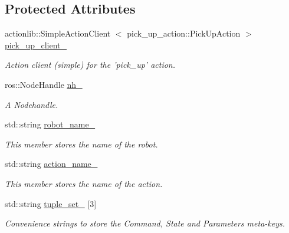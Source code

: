 \subsection*{\-Protected \-Attributes}
\begin{DoxyCompactItemize}
\item 
actionlib\-::\-Simple\-Action\-Client\*
$<$ pick\-\_\-up\-\_\-action\-::\-Pick\-Up\-Action $>$ \hyperlink{classexekutor_1_1PickUpExekutor_a49a101b883854d2fd5200dae5277125b}{pick\-\_\-up\-\_\-client\-\_\-}
\begin{DoxyCompactList}\small\item\em \-Action client (simple) for the 'pick\-\_\-up' action. \end{DoxyCompactList}\item 
ros\-::\-Node\-Handle \hyperlink{classexekutor_1_1ActionExekutor_a1f0541608c4f27f3c72ab22b1874c882}{nh\-\_\-}
\begin{DoxyCompactList}\small\item\em \-A \-Nodehandle. \end{DoxyCompactList}\item 
std\-::string \hyperlink{classexekutor_1_1ActionExekutor_af165894bbbbabd62c17be857be095936}{robot\-\_\-name\-\_\-}
\begin{DoxyCompactList}\small\item\em \-This member stores the name of the robot. \end{DoxyCompactList}\item 
std\-::string \hyperlink{classexekutor_1_1ActionExekutor_ad0ab1bb7a2575962ee5fc9e2150c5d50}{action\-\_\-name\-\_\-}
\begin{DoxyCompactList}\small\item\em \-This member stores the name of the action. \end{DoxyCompactList}\item 
std\-::string \hyperlink{classexekutor_1_1ActionExekutor_a4407dd299ca8494945da306b6a367108}{tuple\-\_\-set\-\_\-} \mbox{[}3\mbox{]}
\begin{DoxyCompactList}\small\item\em \-Convenience strings to store the \-Command, \-State and \-Parameters meta-\/keys. \end{DoxyCompactList}\end{DoxyCompactItemize}
